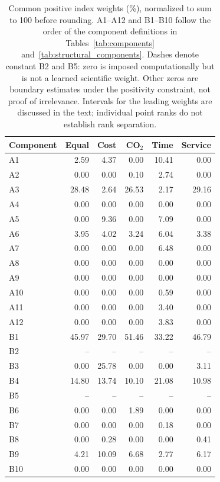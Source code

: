 \begin{table}[htbp]\centering\small
\begin{tabular}{lrrrrr}\toprule
Component & Equal & Cost & CO$_2$ & Time & Service\\\midrule
A1 & 2.59 & 4.37 & 0.00 & 10.41 & 0.00\\
A2 & 0.00 & 0.00 & 0.10 & 2.74 & 0.00\\
A3 & 28.48 & 2.64 & 26.53 & 2.17 & 29.16\\
A4 & 0.00 & 0.00 & 0.00 & 0.00 & 0.00\\
A5 & 0.00 & 9.36 & 0.00 & 7.09 & 0.00\\
A6 & 3.95 & 4.02 & 3.24 & 6.04 & 3.38\\
A7 & 0.00 & 0.00 & 0.00 & 6.48 & 0.00\\
A8 & 0.00 & 0.00 & 0.00 & 0.00 & 0.00\\
A9 & 0.00 & 0.00 & 0.00 & 0.00 & 0.00\\
A10 & 0.00 & 0.00 & 0.00 & 0.59 & 0.00\\
A11 & 0.00 & 0.00 & 0.00 & 3.40 & 0.00\\
A12 & 0.00 & 0.00 & 0.00 & 3.83 & 0.00\\
B1 & 45.97 & 29.70 & 51.46 & 33.22 & 46.79\\
B2 & -- & -- & -- & -- & --\\
B3 & 0.00 & 25.78 & 0.00 & 0.00 & 3.11\\
B4 & 14.80 & 13.74 & 10.10 & 21.08 & 10.98\\
B5 & -- & -- & -- & -- & --\\
B6 & 0.00 & 0.00 & 1.89 & 0.00 & 0.00\\
B7 & 0.00 & 0.00 & 0.00 & 0.18 & 0.00\\
B8 & 0.00 & 0.28 & 0.00 & 0.00 & 0.41\\
B9 & 4.21 & 10.09 & 6.68 & 2.77 & 6.17\\
B10 & 0.00 & 0.00 & 0.00 & 0.00 & 0.00\\
\bottomrule\end{tabular}
\caption{Common positive index weights (\%), normalized to sum to 100
before rounding. A1--A12 and B1--B10 follow the order of the component
definitions in Tables~\ref{tab:components} and~\ref{tab:structural_components}. Dashes denote constant B2 and
B5: zero is imposed computationally but is not a learned scientific
weight. Other zeros are boundary estimates under the positivity
constraint, not proof of irrelevance. Intervals for the leading weights are discussed in the text;
individual point ranks do not establish rank separation.}
\label{tab:p1_common_weights}
\end{table}

